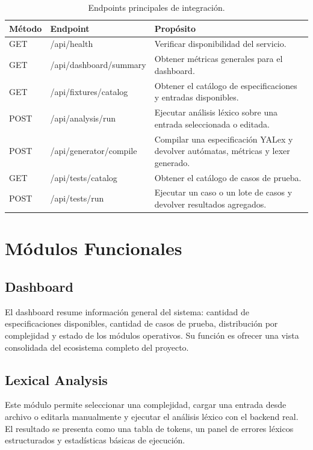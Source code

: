 \documentclass[12pt,a4paper]{article}
\begin{document}
\begin{table}[H]
\centering
\renewcommand{\arraystretch}{1.3}
\begin{tabularx}{\textwidth}{>{\ttfamily\small}l >{\ttfamily\small}l X}
\toprule
\normalfont\textbf{Método} & \normalfont\textbf{Endpoint} & \textbf{Propósito} \\
\midrule
GET & /api/health & Verificar disponibilidad del servicio. \\
GET & /api/dashboard/summary & Obtener métricas generales para el dashboard. \\
GET & /api/fixtures/catalog & Obtener el catálogo de especificaciones y entradas disponibles. \\
POST & /api/analysis/run & Ejecutar análisis léxico sobre una entrada seleccionada o editada. \\
POST & /api/generator/compile & Compilar una especificación YALex y devolver autómatas, métricas y lexer generado. \\
GET & /api/tests/catalog & Obtener el catálogo de casos de prueba. \\
POST & /api/tests/run & Ejecutar un caso o un lote de casos y devolver resultados agregados. \\
\bottomrule
\end{tabularx}
\caption{Endpoints principales de integración.}
\end{table}

\section{Módulos Funcionales}

\subsection{Dashboard}

El dashboard resume información general del sistema: cantidad de especificaciones disponibles, cantidad de casos de prueba, distribución por complejidad y estado de los módulos operativos. Su función es ofrecer una vista consolidada del ecosistema completo del proyecto.

\subsection{Lexical Analysis}

Este módulo permite seleccionar una complejidad, cargar una entrada desde archivo o editarla manualmente y ejecutar el análisis léxico con el backend real. El resultado se presenta como una tabla de tokens, un panel de errores léxicos estructurados y estadísticas básicas de ejecución.
\end{document}
